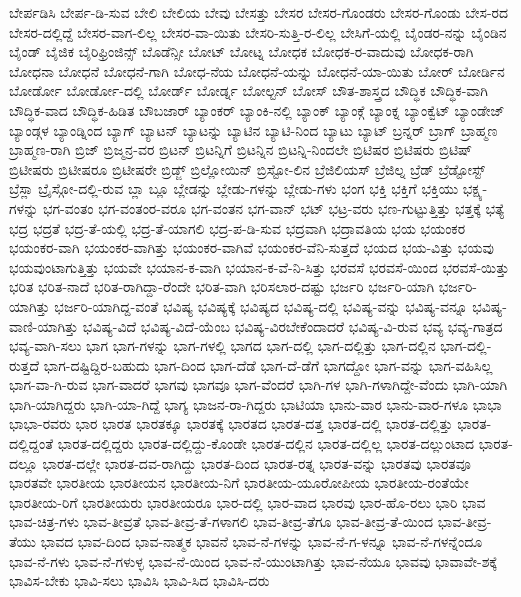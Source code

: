 {ಬೇರ್ಪಡಿಸಿ
ಬೇರ್ಪ-ಡಿ-ಸುವ
ಬೇಲಿ
ಬೇಲಿಯ
ಬೇವು
ಬೇಸತ್ತು
ಬೇಸರ
ಬೇಸರ-ಗೊಂಡರು
ಬೇಸರ-ಗೊಂಡು
ಬೇಸ-ರದ
ಬೇಸರ-ದಲ್ಲಿದ್ದೆ
ಬೇಸರ-ವಾಗ-ಲಿಲ್ಲ
ಬೇಸರ-ವಾ-ಯಿತು
ಬೇಸರಿ-ಸುತ್ತಿ-ರ-ಲಿಲ್ಲ
ಬೇಸಿಗೆ-ಯಲ್ಲಿ
ಬೈಂಡರ-ನನ್ನು
ಬೈಂಡಿನ
ಬೈಂಡ್
ಬೈಜಿಕ
ಬೈರಿಫ್ರಿಂಜಿನ್ಸ್
ಬೊಡೆನ್ಸೀ
ಬೋಟ್
ಬೋಟ್ನ
ಬೋಧಕ
ಬೋಧಕ-ರ-ವಾದುವು
ಬೋಧಕ-ರಾಗಿ
ಬೋಧನಾ
ಬೋಧನೆ
ಬೋಧನೆ-ಗಾಗಿ
ಬೋಧ-ನೆಯ
ಬೋಧನೆ-ಯನ್ನು
ಬೋಧನೆ-ಯಾ-ಯಿತು
ಬೋರ್
ಬೋರ್ಡಿನ
ಬೋರ್ಡೋ
ಬೋರ್ಡೋ-ದಲ್ಲಿ
ಬೋರ್ಡ್
ಬೋರ್ಡ್ನ
ಬೋಲ್ಟನ್
ಬೋಸ್
ಬೌತ-ಶಾಸ್ತ್ರದ
ಬೌದ್ಧಿಕ
ಬೌದ್ಧಿಕ-ವಾಗಿ
ಬೌದ್ಧಿಕ-ವಾದ
ಬೌದ್ಧಿಕ-ಹಿಡಿತ
ಬೌಬಜಾರ್
ಬ್ಯಾಂಕರ್
ಬ್ಯಾಂಕಿ-ನಲ್ಲಿ
ಬ್ಯಾಂಕ್
ಬ್ಯಾಂಕ್ಗೆ
ಬ್ಯಾಂಕ್ನ
ಬ್ಯಾಂಕ್ವೆಟ್
ಬ್ಯಾಂಡೇಜ್
ಬ್ಯಾಂಡ್ಗಳ
ಬ್ಯಾಂಡ್ನಿಂದ
ಬ್ಯಾಗ್
ಬ್ಯಾಟನ್
ಬ್ಯಾಟನ್ನು
ಬ್ಯಾಟಿನ
ಬ್ಯಾಟಿ-ನಿಂದ
ಬ್ಯಾಟು
ಬ್ಯಾಟ್
ಬ್ರನ್ನರ್
ಬ್ರಾಗ್
ಬ್ರಾಹ್ಮಣ
ಬ್ರಾಹ್ಮಣ-ರಾಗಿ
ಬ್ರಿಜ್
ಬ್ರಿಜ್ಮನ್ರ-ವರ
ಬ್ರಿಟನ್
ಬ್ರಿಟನ್ನಿಗೆ
ಬ್ರಿಟನ್ನಿನ
ಬ್ರಿಟನ್ನಿ-ನಿಂದಲೇ
ಬ್ರಿಟಿಷರ
ಬ್ರಿಟಿಷರು
ಬ್ರಿಟಿಷ್
ಬ್ರಿಟೀಷರು
ಬ್ರಿಟೀಷರೂ
ಬ್ರಿಟೀಷರೇ
ಬ್ರಿಡ್ಜ್
ಬ್ರಿಲ್ಲೋಯಿನ್
ಬ್ರಿಸ್ಟೋ-ಲಿನ
ಬ್ರೆಜಿಲಿಯಸ್
ಬ್ರೆಜಿಲ್ನ
ಬ್ರೆಡ್
ಬ್ರೆಡ್ಟೋಸ್ಟ್
ಬ್ರೆಸ್ಲಾ
ಬ್ರೈಸ್ಗೋ-ದಲ್ಲಿ-ರುವ
ಬ್ಲಾ
ಬ್ಲೂ
ಬ್ಲೇಡನ್ನು
ಬ್ಲೇಡು-ಗಳನ್ನು
ಬ್ಲೇಡು-ಗಳು
ಭಂಗ
ಭಕ್ತಿ
ಭಕ್ತಿಗೆ
ಭಕ್ತಿಯು
ಭಕ್ಷ್ಯ-ಗಳನ್ನು
ಭಗ-ವಂತಂ
ಭಗ-ವಂತಂರ-ವರೂ
ಭಗ-ವಂತನ
ಭಗ-ವಾನ್
ಭಟ್
ಭಟ್ರ-ವರು
ಭಣ-ಗುಟ್ಟುತ್ತಿತ್ತು
ಭತ್ತಕ್ಕೆ
ಭತ್ಯೆ
ಭದ್ರ
ಭದ್ರತೆ
ಭದ್ರ-ತೆ-ಯಲ್ಲಿ
ಭದ್ರ-ತೆ-ಯಾಗಲಿ
ಭದ್ರ-ಪ-ಡಿ-ಸುವ
ಭದ್ರವಾಗಿ
ಭದ್ರಾವತಿಯ
ಭಯ
ಭಯಂಕರ
ಭಯಂಕರ-ವಾಗಿ
ಭಯಂಕರ-ವಾಗಿತ್ತು
ಭಯಂಕರ-ವಾಗಿವೆ
ಭಯಂಕರ-ವೆನಿ-ಸುತ್ತದೆ
ಭಯದ
ಭಯ-ವಿತ್ತು
ಭಯವು
ಭಯವುಂಟಾಗುತ್ತಿತ್ತು
ಭಯವೇ
ಭಯಾನ-ಕ-ವಾಗಿ
ಭಯಾನ-ಕ-ವೆ-ನಿ-ಸಿತ್ತು
ಭರವಸೆ
ಭರವಸೆ-ಯಿಂದ
ಭರವಸೆ-ಯಿತ್ತು
ಭರಿತ
ಭರಿತ-ನಾದೆ
ಭರಿತ-ರಾಗಿದ್ದಾ-ರೆಂದೇ
ಭರಿತ-ವಾಗಿ
ಭರಿಸಲಾರ-ದಷ್ಟು
ಭರ್ಜರಿ
ಭರ್ಜರಿ-ಯಾಗಿ
ಭರ್ಜರಿ-ಯಾಗಿತ್ತು
ಭರ್ಜರಿ-ಯಾಗಿದ್ದ-ವಂತೆ
ಭವಿಷ್ಯ
ಭವಿಷ್ಯಕ್ಕೆ
ಭವಿಷ್ಯದ
ಭವಿಷ್ಯ-ದಲ್ಲಿ
ಭವಿಷ್ಯ-ವನ್ನು
ಭವಿಷ್ಯ-ವನ್ನೂ
ಭವಿಷ್ಯ-ವಾಣಿ-ಯಾಗಿತ್ತು
ಭವಿಷ್ಯ-ವಿದೆ
ಭವಿಷ್ಯ-ವಿದೆ-ಯೆಂಬ
ಭವಿಷ್ಯ-ವಿರಬೇಕೆಂದಾದರೆ
ಭವಿಷ್ಯ-ವಿ-ರುವ
ಭವ್ಯ
ಭವ್ಯ-ಗಾತ್ರದ
ಭವ್ಯ-ವಾಗಿ-ಸಲು
ಭಾಗ
ಭಾಗ-ಗಳನ್ನು
ಭಾಗ-ಗಳಲ್ಲಿ
ಭಾಗದ
ಭಾಗ-ದಲ್ಲಿ
ಭಾಗ-ದಲ್ಲಿತ್ತು
ಭಾಗ-ದಲ್ಲಿನ
ಭಾಗ-ದಲ್ಲಿ-ರುತ್ತದೆ
ಭಾಗ-ದಷ್ಟಿದ್ದಿರ-ಬಹುದು
ಭಾಗ-ದಿಂದ
ಭಾಗ-ದೆಡೆ
ಭಾಗ-ದೆ-ಡೆಗೆ
ಭಾಗದ್ದೋ
ಭಾಗ-ವನ್ನು
ಭಾಗ-ವಹಿಸಿಲ್ಲ
ಭಾಗ-ವಾ-ಗಿ-ರುವ
ಭಾಗ-ವಾದರೆ
ಭಾಗವು
ಭಾಗವೂ
ಭಾಗ-ವೆಂದರೆ
ಭಾಗಿ-ಗಳ
ಭಾಗಿ-ಗಳಾಗಿದ್ದೇ-ವೆಂದು
ಭಾಗಿ-ಯಾಗಿ
ಭಾಗಿ-ಯಾಗಿದ್ದರು
ಭಾಗಿ-ಯಾ-ಗಿದ್ದೆ
ಭಾಗ್ಯ
ಭಾಜನ-ರಾ-ಗಿದ್ದರು
ಭಾಟಿಯಾ
ಭಾನು-ವಾರ
ಭಾನು-ವಾರ-ಗಳೂ
ಭಾಭಾ
ಭಾಭಾ-ರವರು
ಭಾರ
ಭಾರತ
ಭಾರತಕ್ಕೂ
ಭಾರತಕ್ಕೆ
ಭಾರತದ
ಭಾರತ-ದತ್ತ
ಭಾರತ-ದಲ್ಲಿ
ಭಾರತ-ದಲ್ಲಿತ್ತು
ಭಾರತ-ದಲ್ಲಿದ್ದಂತೆ
ಭಾರತ-ದಲ್ಲಿದ್ದರು
ಭಾರತ-ದಲ್ಲಿದ್ದು-ಕೊಂಡೇ
ಭಾರತ-ದಲ್ಲಿನ
ಭಾರತ-ದಲ್ಲಿಲ್ಲ
ಭಾರತ-ದಲ್ಲುಂಟಾದ
ಭಾರತ-ದಲ್ಲೂ
ಭಾರತ-ದಲ್ಲೇ
ಭಾರತ-ದವ-ರಾಗಿದ್ದು
ಭಾರತ-ದಿಂದ
ಭಾರತ-ರತ್ನ
ಭಾರತ-ವನ್ನು
ಭಾರತವು
ಭಾರತವೂ
ಭಾರತವೇ
ಭಾರತೀಯ
ಭಾರತೀಯನ
ಭಾರತೀಯ-ನಿಗೆ
ಭಾರತೀಯ-ಯೂರೋಪೀಯ
ಭಾರತೀಯ-ರಂತೆಯೇ
ಭಾರತೀಯ-ರಿಗೆ
ಭಾರತೀಯರು
ಭಾರತೀಯರೂ
ಭಾರ-ದಲ್ಲಿ
ಭಾರ-ವಾದ
ಭಾರವು
ಭಾರ-ಹೊ-ರಲು
ಭಾರಿ
ಭಾವ
ಭಾವ-ಚಿತ್ರ-ಗಳು
ಭಾವ-ತೀವ್ರತೆ
ಭಾವ-ತೀವ್ರ-ತೆ-ಗಳಾಗಲಿ
ಭಾವ-ತೀವ್ರ-ತೆಗೂ
ಭಾವ-ತೀವ್ರ-ತೆ-ಯಿಂದ
ಭಾವ-ತೀವ್ರ-ತೆಯು
ಭಾವದ
ಭಾವ-ದಿಂದ
ಭಾವ-ನಾತ್ಮಕ
ಭಾವನೆ
ಭಾವ-ನೆ-ಗಳನ್ನು
ಭಾವ-ನೆ-ಗ-ಳನ್ನೂ
ಭಾವ-ನೆ-ಗಳನ್ನೆಂದೂ
ಭಾವ-ನೆ-ಗಳು
ಭಾವ-ನೆ-ಗಳುಳ್ಳ
ಭಾವ-ನೆ-ಯಿಂದ
ಭಾವ-ನೆ-ಯುಂಟಾಗಿತ್ತು
ಭಾವ-ನೆಯೂ
ಭಾವವು
ಭಾವಾವೇ-ಶಕ್ಕೆ
ಭಾವಿಸ-ಬೇಕು
ಭಾವಿ-ಸಲು
ಭಾವಿಸಿ
ಭಾವಿ-ಸಿದ
ಭಾವಿಸಿ-ದರು
}
